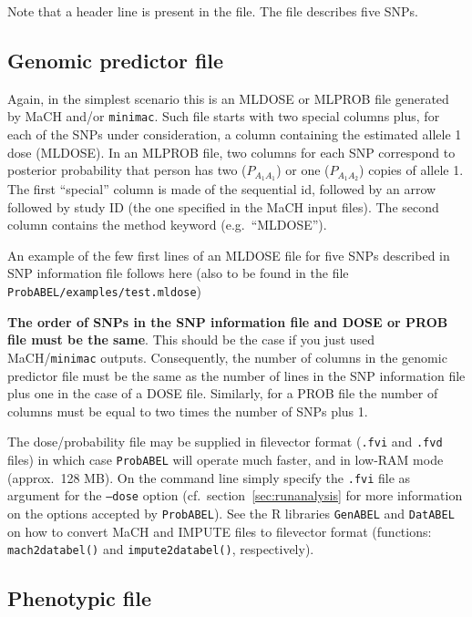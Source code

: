\documentclass[12pt,a4paper]{article}
\newcommand{\GA}{\texttt{GenABEL}}
\newcommand{\DA}{\texttt{DatABEL}}
\begin{document}

Note that a header line is present in the file. The file describes
five SNPs.

\subsection{Genomic predictor file}
\label{ssec:dosein}

Again, in the simplest scenario this is an MLDOSE or MLPROB file
generated by MaCH and/or \texttt{minimac}.  Such file starts with two
special columns plus, for each of the SNPs under consideration, a
column containing the estimated allele 1 dose (MLDOSE).  In an MLPROB
file, two columns for each SNP correspond to posterior probability
that person has two ($P_{A_1A_1}$) or one ($P_{A_1A_2}$) copies of
allele 1.  The first ``special'' column is made of the sequential id,
followed by an arrow followed by study ID (the one specified in the
MaCH input files). The second column contains the method keyword
(e.g.~``MLDOSE'').

An example of the few first lines of an MLDOSE file for
five SNPs described in SNP information file follows here (also
to be found in the file \texttt{ProbABEL/examples/test.mldose})




\textbf{The order of SNPs in the SNP information file and DOSE or PROB
  file must be the same}. This should be the case if you just used
MaCH/\texttt{minimac} outputs.
Consequently, the number of columns in the genomic predictor file
must be the same as the number of lines in the SNP information file
plus one in the case of a DOSE file. Similarly, for a PROB file the
number of columns must be equal to two times the number of SNPs plus
1.

The dose/probability file may be supplied in filevector format
(\texttt{.fvi} and \texttt{.fvd} files) in which case
\texttt{ProbABEL} will operate much faster, and in low-RAM mode
(approx.~128 MB). On the command line simply specify the \texttt{.fvi}
file as argument for the \texttt{--dose} option
(cf.~section~\ref{sec:runanalysis} for more information on the options
accepted by \texttt{ProbABEL}). See the R libraries \GA{} and
\DA{} on how to convert MaCH and IMPUTE files to
filevector format (functions: \texttt{mach2databel()} and
\texttt{impute2databel()}, respectively).


\subsection{Phenotypic file}
\label{ssec:phenoin}
\end{document}
